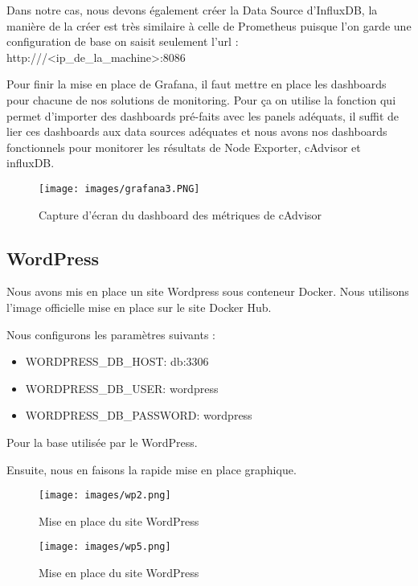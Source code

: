 \documentclass[oneside,12pt]{report}
\begin{document}
Dans notre cas, nous devons également créer la Data Source d'InfluxDB, la manière de la créer est très similaire à celle de Prometheus puisque l'on garde une configuration de base on saisit seulement l'url : http:///<ip\_de\_la\_machine>:8086\newline

Pour finir la mise en place de Grafana, il faut mettre en place les dashboards pour chacune de nos solutions de monitoring. Pour ça on utilise la fonction qui permet d'importer des dashboards pré-faits avec les panels adéquats, il suffit de lier ces dashboards aux data sources adéquates et nous avons nos dashboards fonctionnels pour monitorer les résultats de Node Exporter, cAdvisor et influxDB.

\begin{figure}[H]
    \centering
    \texttt{[image: images/grafana3.PNG]}
    \caption{Capture d'écran du dashboard des métriques de cAdvisor}
    \label{fig:mesh1}
\end{figure}

\subsection{WordPress}

Nous avons mis en place un site Wordpress sous conteneur Docker. Nous utilisons l'image officielle mise en place sur le site Docker Hub.\newline

Nous configurons les paramètres suivants :\newline
\begin{itemize}
    \item WORDPRESS\_DB\_HOST: db:3306
    \item WORDPRESS\_DB\_USER: wordpress
    \item WORDPRESS\_DB\_PASSWORD: wordpress
\end{itemize}
\newline

Pour la base utilisée par le WordPress.

Ensuite, nous en faisons la rapide mise en place graphique.
\begin{figure}[H]
    \centering
    \texttt{[image: images/wp2.png]}
    \caption{Mise en place du site WordPress}
    \label{fig:mesh1}
\end{figure}

\begin{figure}[H]
    \centering
    \texttt{[image: images/wp5.png]}
    \caption{Mise en place du site WordPress}
    \label{fig:mesh1}
\end{figure}
\end{document}
